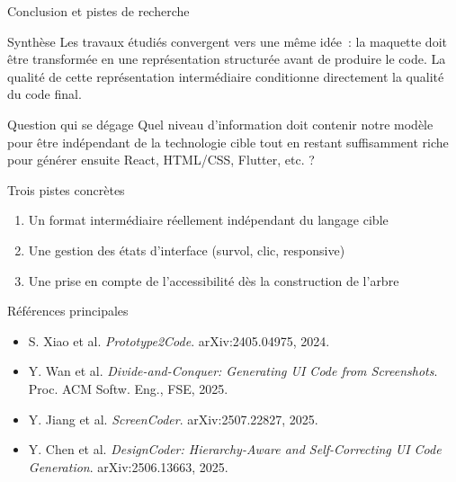 \documentclass[11pt]{beamer}
\begin{document}
\begin{frame}{Conclusion et pistes de recherche}
\begin{block}{Synthèse}
Les travaux étudiés convergent vers une même idée~: la maquette doit être transformée en une représentation structurée avant de produire le code. La qualité de cette représentation intermédiaire conditionne directement la qualité du code final.
\end{block}
\begin{alertblock}{Question qui se dégage}
Quel niveau d'information doit contenir notre modèle pour être indépendant de la technologie cible tout en restant suffisamment riche pour générer ensuite React, HTML/CSS, Flutter, etc. ?
\end{alertblock}
\begin{block}{Trois pistes concrètes}
\begin{enumerate}
\item Un format intermédiaire réellement indépendant du langage cible
\item Une gestion des états d'interface (survol, clic, responsive)
\item Une prise en compte de l'accessibilité dès la construction de l'arbre
\end{enumerate}
\end{block}
\end{frame}

\begin{frame}{Références principales}
\footnotesize
\begin{itemize}
\item S. Xiao et al. \textit{Prototype2Code}. arXiv:2405.04975, 2024.
\item Y. Wan et al. \textit{Divide-and-Conquer: Generating UI Code from Screenshots}. Proc. ACM Softw. Eng., FSE, 2025.
\item Y. Jiang et al. \textit{ScreenCoder}. arXiv:2507.22827, 2025.
\item Y. Chen et al. \textit{DesignCoder: Hierarchy-Aware and Self-Correcting UI Code Generation}. arXiv:2506.13663, 2025.
\end{itemize}
\end{frame}
\end{document}

